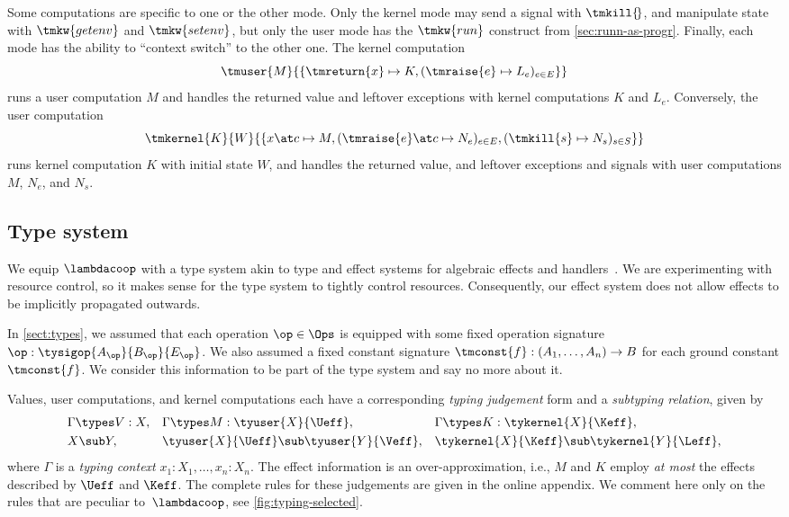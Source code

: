 Some computations are specific to one or the other mode. Only the kernel mode
may send a signal with $\tmkill{\!}$, and manipulate state with
$\tmkw{getenv}$ and $\tmkw{setenv}$, but only the user mode has the 
$\tmkw{run}$ construct from \cref{sec:runn-as-progr}.
%
Finally, each mode has the ability to ``context switch'' to the other one.
The kernel computation
%
\begin{equation*}
\tmuser{M}{
   \{
     \tmreturn{x} \mapsto K,
     (\tmraise{e} \mapsto L_e)_{e \in E}
   \}
}
\end{equation*}
%
runs a user computation $M$ and handles the returned value and leftover
exceptions with kernel computations $K$ and $L_e$.
Conversely, the user computation
%
\begin{equation*}
\tmkernel{K}{W}{
  \{x \at c \mapsto M,
    (\tmraise{e} \at c \mapsto N_e)_{e \in E},
    (\tmkill{s} \mapsto N_s)_{s \in S}
  \}
}
\end{equation*}
%
runs kernel computation $K$ with initial state $W$, and handles the returned value,
and leftover exceptions and signals with user computations $M$, $N_e$, and $N_s$.

\subsection{Type system}
\label{sec:typesystem}

We equip $\lambdacoop$ with a type system akin to type and effect systems for
algebraic effects and handlers~\cite{Bauer:EffectSystem,Benton:ExceptionalSyntax,Kammar:Handlers}.
We are experimenting with resource control, so it makes sense for the type system
to tightly control resources. Consequently, our effect system
does not allow effects to be implicitly propagated outwards.

In \cref{sect:types}, we assumed that each operation $\op \in \Ops$ 
is equipped with some fixed operation signature
%
$
  \op : \tysigop{A_\op}{B_\op}{E_\op}
$.
%
We also assumed a fixed constant signature $\tmconst{f} : (A_1, \ldots, A_n) \to B$
for each ground constant $\tmconst{f}$.
%
We consider this information to be part of the type system and say no more about it.

Values, user computations, and kernel computations each have a corresponding
\emph{typing judgement} form and a \emph{subtyping relation}, given by 
%
\begin{align*}
  &\Gamma \types V : X,
& &\Gamma \types M : \tyuser{X}{\Ueff},
& &\Gamma \types K : \tykernel{X}{\Keff},\\
  &X \sub Y,
& &\tyuser{X}{\Ueff} \sub \tyuser{Y}{\Veff},
& &\tykernel{X}{\Keff} \sub \tykernel{Y}{\Leff}, 
\end{align*}
%
where $\Gamma$ is a \emph{typing context} $x_1 : X_1, \ldots, x_n : X_n$.
%
The effect information is an over-approximation, i.e., $M$ and $K$ employ \emph{at
  most} the effects described by $\Ueff$ and $\Keff$.
%
The complete rules for these judgements are given in the online appendix. %
We comment here
only on the rules that are peculiar to~$\lambdacoop$, see \cref{fig:typing-selected}.

